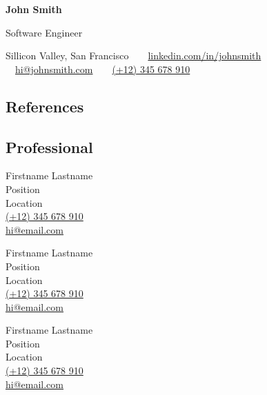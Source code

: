 \documentclass[10pt,a4paper]{article}
\begin{document}

\begin{center}
	{\LARGE \textbf{John Smith}}\vspace{0.2cm}
				
	{\large Software Engineer}\vspace{0.2cm}
				
	Sillicon Valley, San Francisco\ \ \textbullet \ \
	\href{https://linkedin.com/in/johnsmith}{linkedin.com/in/johnsmith} \textbullet \ \
	\href{mailto:hi@johnsmith.com}{hi@johnsmith.com}\ \ \textbullet \ \
	\href{tel:+12345678910}{(+12) 345 678 910} \ \
\end{center}



\subsection*{\textcolor{accent}{\Large References  \sout{\hfill}}}\vspace{0.5cm}

\subsection*{Professional}\vspace{0.2cm}

\begin{multicols}{2}
	{\large Firstname Lastname}\\
	Position\\
	Location\\
	\href{tel:+12345678910}{(+12) 345 678 910}\\
	\href{mailto:hi@email.com}{hi@email.com}\\
	\vspace{1.5cm}

	{\large Firstname Lastname}\\
	Position\\
	Location\\
	\href{tel:+12345678910}{(+12) 345 678 910}\\
	\href{mailto:hi@email.com}{hi@email.com}\\
	\vspace{1.5cm}

	\columnbreak

	{\large Firstname Lastname}\\
	Position\\
	Location\\
	\href{tel:+12345678910}{(+12) 345 678 910}\\
	\href{mailto:hi@email.com}{hi@email.com}\\
	\vspace{1.5cm}
\end{multicols}
\end{document}
